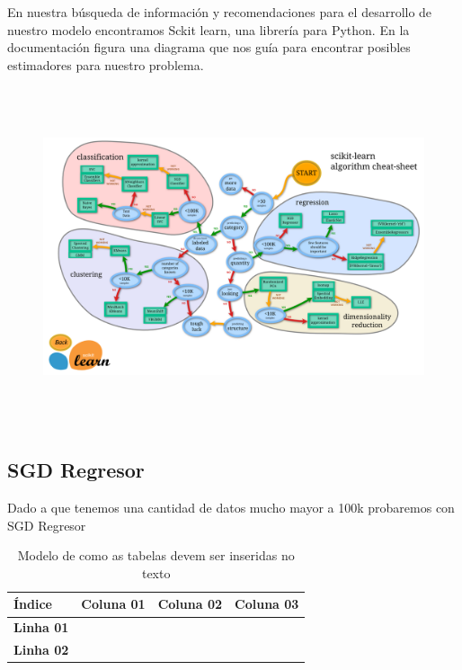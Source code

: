 En nuestra búsqueda de información y recomendaciones para el desarrollo de nuestro modelo encontramos Sckit learn, una librería para Python. 
En la documentación figura una diagrama que nos guía para encontrar posibles estimadores para nuestro problema.

\begin{figure}[h]
\centering
\includegraphics[height=10cm]{imagenes/sckit.png}
\label{fig:exemplo}
\end{figure}

\subsection{SGD Regresor}
Dado a que tenemos una cantidad de datos mucho mayor a 100k probaremos con SGD Regresor


\begin{table}[h]
\centering
\caption{ Modelo de como as tabelas devem ser inseridas no texto }
\vspace{0.2in}
%
\newcommand{\rowstyle}[1]{%
  \protected\gdef\currentrowstyle{#1}%
}
\begin{tabularx}{\textwidth}{>{\bf}C|C|C|C}
\hline 
\textbf {Índice} & \textbf{Coluna 01} &\textbf{ Coluna 02} & \textbf{Coluna 03} \\ \hline \hline
Linha 01 & & & \\ \hline
Linha 02 & & & \\ \hline                         

\end{tabularx}
\end{table}






